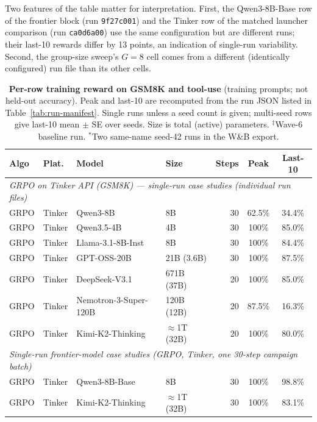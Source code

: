 Two features of the table matter for interpretation. First, the
Qwen3-8B-Base row of the frontier block (run \texttt{9f27c001}) and the
Tinker row of the matched launcher comparison (run \texttt{ca0d6a00}) use
the same configuration but are different runs; their last-10 rewards differ
by 13 points, an indication of single-run variability. Second, the
group-size sweep's $G{=}8$ cell comes from a different (identically
configured) run file than its other cells.

\begin{table}[htbp]
\centering
\caption{\textbf{Per-row training reward on GSM8K and tool-use} (training
prompts; not held-out accuracy). Peak and last-10 are recomputed from the
run JSON listed in Table~\ref{tab:run-manifest}. Single runs unless a seed
count is given; multi-seed rows give last-10 mean $\pm$ SE over seeds. Size
is total (active) parameters. $^\ddagger$Wave-6 baseline run. $^\ast$Two same-name seed-42 runs in the W\&B export.}
\label{tab:main_results}
\scriptsize
\setlength{\tabcolsep}{3pt}
\begin{tabular}{@{}l l l l r c c@{}}
\toprule
\textbf{Algo} & \textbf{Plat.} & \textbf{Model} & \textbf{Size} & \textbf{Steps} & \textbf{Peak} & \textbf{Last-10} \\
\midrule
\multicolumn{7}{l}{\textit{GRPO on Tinker API (GSM8K) --- single-run case studies (individual run files)}} \\
\midrule
GRPO & Tinker & Qwen3-8B & 8B & 30 & 62.5\% & 34.4\% \\
GRPO & Tinker & Qwen3.5-4B & 4B & 30 & 100\% & 85.0\% \\
GRPO & Tinker & Llama-3.1-8B-Inst & 8B & 30 & 100\% & 84.4\% \\
GRPO & Tinker & GPT-OSS-20B & 21B (3.6B) & 30 & 100\% & 87.5\% \\
GRPO & Tinker & DeepSeek-V3.1 & 671B (37B) & 20 & 100\% & 85.0\% \\
GRPO & Tinker & Nemotron-3-Super-120B & 120B (12B) & 20 & 87.5\% & 16.3\% \\
GRPO & Tinker & Kimi-K2-Thinking & ${\approx}$1T (32B) & 20 & 100\% & 80.0\% \\
\midrule
\multicolumn{7}{l}{\textit{Single-run frontier-model case studies (GRPO, Tinker, one 30-step campaign batch)}} \\
\midrule
GRPO & Tinker & Qwen3-8B-Base & 8B & 30 & 100\% & 98.8\% \\
GRPO & Tinker & Kimi-K2-Thinking & ${\approx}$1T (32B) & 30 & 100\% & 83.1\% \\

\end{tabular}
\end{table}
